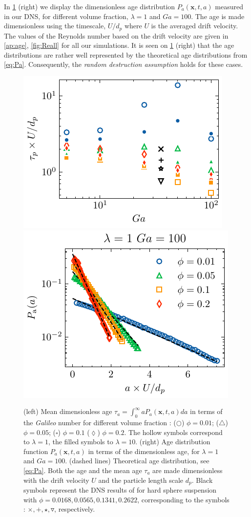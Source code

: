 In \ref{fig:age_picture} (right) we display the dimensionless age distribution $P_a(\textbf{x},t,a)$ measured in our DNS, for different volume fraction, $\lambda =1$ and $Ga = 100$. 
The age is made dimensionless using the timescale, $U/d_p$ where $U$ is the averaged drift velocity.
The values of the Reynolds number based on the drift velocity are given in \ref{ap:age}, \ref{fig:Reall} for all our simulations. 
It is seen on \ref{fig:age_picture} (right) that the age distributions are rather well represented by the theoretical age distributions from \ref{eq:Pa}.
Consequently, the \textit{random destruction assumption} holds for these cases. 
\begin{figure}[h!]
    \centering
    \includegraphics[height = 0.3\textwidth]{image/HOMOGENEOUS_NEW/tau_Ga.pdf}
    \includegraphics[height = 0.3\textwidth]{image/HOMOGENEOUS_NEW/Dist/Pa_l_1_Ga_100.pdf}
    \caption{
    (left) Mean dimensionless age $\tau_a =  \int_0^\infty aP_a(\textbf{x},t,a)da$ in terms of the \textit{Galileo} number for different volume fraction :   
    ($\pmb\bigcirc$) $\phi = 0.01$; ($\pmb\triangle$) $ \phi = 0.05$; ($\pmb\square$) $\phi = 0.1$ ($\pmb\lozenge$) $\phi = 0.2$.
    The hollow symbols correspond to $\lambda = 1$, the filled symbols to $\lambda = 10$.
    (right) Age distribution function $P_a(\textbf{x},t,a)$ in terms of the dimensionless age, for $\lambda = 1$ and  $Ga = 100$.
    (dashed lines) Theoretical age distribution, see \ref{eq:Pa}. 
    Both the age and the mean age $\tau_a$ are made dimensionless with the drift velocity $U$ and the particle length scale $d_p$.  
    Black symbols represent the DNS results of \citet{zhang2023evolution} for hard sphere suspension with $\phi = 0.0168,0.0565,0.1341,0.2622$, corresponding to the symbols : $\pmb\times, \pmb +, \pmb\star , \pmb\triangledown$, respectively.
    }
    \label{fig:age_picture}
\end{figure}
